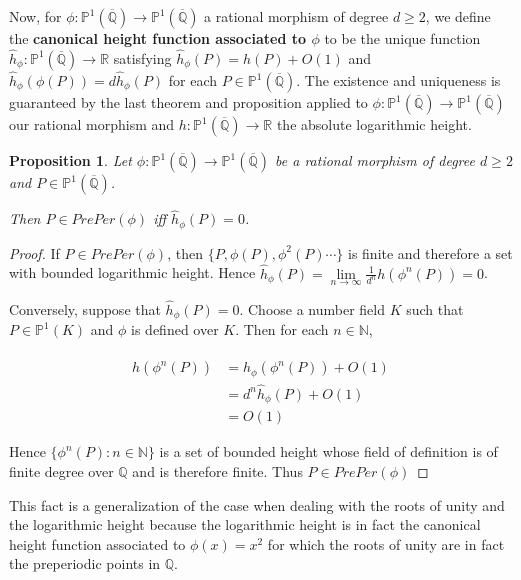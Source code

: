 \documentclass[12pt]{amsart}
\newtheorem{prop}[thm]{Proposition}
\theoremstyle{definition}
\theoremstyle{remark}
\theoremstyle{definition}
\newcommand{\R}{\mathbb{R}}
\newcommand{\N}{\mathbb{N}}
\newcommand{\Q}{\mathbb{Q}}
\renewcommand{\P}{\mathbb{P}}
\begin{document}
Now, for $\phi: \P^1(\overline{\Q}) \rightarrow \P^1(\overline{\Q})$ a rational morphism of degree $d \geq 2$, we define the \textbf{canonical height function associated to $\phi$} to be the unique function $\hat{h}_\phi: \P^1(\overline{\Q}) \rightarrow \R$ satisfying 
$\hat{h}_\phi(P) = h(P) + O(1)$ and $\hat{h}_\phi(\phi(P)) =  d\hat{h}_\phi(P)$ for each $P \in \P^1(\overline{\Q})$. The existence and 
uniqueness is guaranteed by the last theorem and proposition applied to $\phi: \P^1(\overline{\Q}) \rightarrow \P^1(\overline{\Q})$ our rational morphism and $h:\P^1(\overline{\Q}) \rightarrow \R$ the absolute logarithmic height.

\begin{prop}

Let $\phi: \P^1(\overline{\Q}) \rightarrow \P^1(\overline{\Q})$ be a rational morphism of degree $d \geq 2$ and $P \in \P^1(\overline{\Q})$. 

Then $P \in PrePer(\phi)$ iff $\hat{h}_\phi(P) = 0$.

\end{prop}

\begin{proof}

If $P \in PrePer(\phi)$, then $\{P, \phi(P), \phi^2(P) \cdots\}$ is finite and therefore a set with bounded logarithmic height. Hence 
$\hat{h}_\phi(P) = \lim\limits_{n \rightarrow \infty}\frac{1}{d^n} h(\phi^n(P)) = 0$.

Conversely, suppose that $\hat{h}_\phi(P) = 0$. Choose a number field $K$ such that $P \in \P^1(K)$ and $\phi$ is defined over $K$. Then for each $n \in \N$, 

\begin{align*}
h(\phi^n(P)) 
&= \hat{h}_\phi(\phi^n(P)) + O(1)\\
&= d^n\hat{h}_\phi(P) + O(1)\\
&= O(1)
\end{align*}

Hence $\{\phi^n(P):n \in \N\}$ is a set of bounded height whose field of definition is of finite degree over $\Q$ and is therefore finite. Thus $P \in PrePer(\phi)$ 

\end{proof}

This fact is a generalization of the case when dealing with the roots of unity and the logarithmic height because the logarithmic height is in fact the canonical height function associated to $\phi(x) = x^2$ for which the roots of unity are in fact the preperiodic points in $\Q$. 
\end{document}
